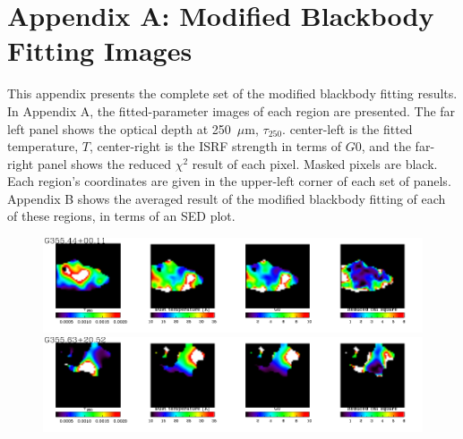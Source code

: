 \chapter*{Appendix A:
Modified Blackbody Fitting Images}
This appendix presents the complete set of the modified blackbody fitting results. In Appendix A, the fitted-parameter images of each region are presented. The far left panel shows the optical depth at 250~$\mu$m, $\tau_{250}$. center-left is the fitted temperature, $T$, center-right is the ISRF strength in terms of $G0$, and the far-right panel shows the reduced $\chi^2$ result of each pixel. Masked pixels are black. Each region's coordinates are given in the upper-left corner of each set of panels. Appendix B shows the averaged result of the modified blackbody fitting of each of these regions, in terms of an SED plot.

\begin{figure}[!htb]
\centering
\includegraphics[trim=0 2mm 0 0, clip, width=190mm]{appA/appA_96.pdf}
\includegraphics[trim=0 2mm 0 0, clip, width=190mm]{appA/appA_97.pdf}
\end{figure}

